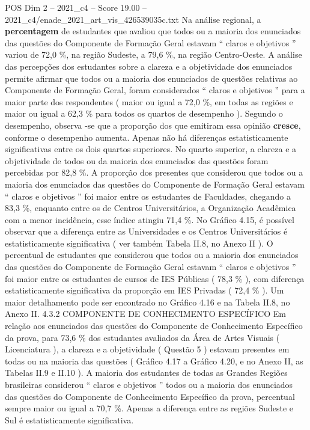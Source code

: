 \begin{textsample}{POS Dim 2 – 2021\_c4 – Score 19.00 – 2021\_c4/enade\_2021\_art\_vis\_426539035c.txt}
Na análise regional, a \textbf{percentagem} de estudantes que avaliou que todos ou a maioria dos enunciados das questões do Componente de Formação Geral estavam “ claros e objetivos ” variou de 72,0 \%, na região Sudeste, a 79,6 \%, na região Centro-Oeste.
A análise das percepções dos estudantes sobre a clareza e a objetividade dos enunciados permite afirmar que todos ou a maioria dos enunciados de questões relativas ao Componente de Formação Geral, foram considerados “ claros e objetivos ” para a maior parte dos respondentes ( maior ou igual a 72,0 \%, em todas as regiões e maior ou igual a 62,3 \% para todos os quartos de desempenho ).
Segundo o desempenho, observa -se que a proporção dos que emitiram essa opinião \textbf{cresce}, conforme o desempenho aumenta.
Apenas não há diferenças estatisticamente significativas entre os dois quartos superiores.
No quarto superior, a clareza e a objetividade de todos ou da maioria dos enunciados das questões foram percebidas por 82,8 \%.
A proporção dos presentes que considerou que todos ou a maioria dos enunciados das questões do Componente de Formação Geral estavam “ claros e objetivos ” foi maior entre os estudantes de Faculdades, chegando a 83,3 \%, enquanto entre os de Centros Universitários, a Organização Acadêmica com a menor incidência, esse índice atingiu 71,4 \%.
No Gráfico 4.15, é possível observar que a diferença entre as Universidades e os Centros Universitários é estatisticamente significativa ( ver também Tabela II.8, no Anexo II ).
O percentual de estudantes que considerou que todos ou a maioria dos enunciados das questões do Componente de Formação Geral estavam “ claros e objetivos ” foi maior entre os estudantes de cursos de IES Públicas ( 78,3 \% ), com diferença estatisticamente significativa da proporção em IES Privadas ( 72,4 \% ).
Um maior detalhamento pode ser encontrado no Gráfico 4.16 e na Tabela II.8, no Anexo II. 4.3.2 COMPONENTE DE CONHECIMENTO ESPECÍFICO Em relação aos enunciados das questões do Componente de Conhecimento Específico da prova, para 73,6 \% dos estudantes avaliados da Área de Artes Visuais ( Licenciatura ), a clareza e a objetividade ( Questão 5 ) estavam presentes em todas ou na maioria das questões ( Gráfico 4.17 a Gráfico 4.20, e no Anexo II, as Tabelas II.9 e II.10 ).
A maioria dos estudantes de todas as Grandes Regiões brasileiras considerou “ claros e objetivos ” todos ou a maioria dos enunciados das questões do Componente de Conhecimento Específico da prova, percentual sempre maior ou igual a 70,7 \%.
Apenas a diferença entre as regiões Sudeste e Sul é estatisticamente significativa.

\end{textsample}
